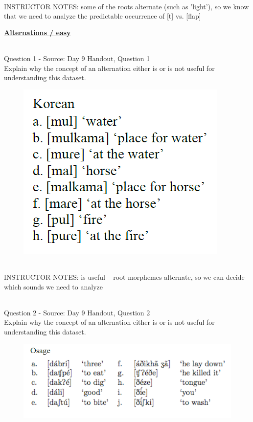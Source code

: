 \documentclass[12pt]{article}
\begin{document}
~\\
INSTRUCTOR NOTES: some of the roots alternate (such as 'light'), so we know that we need to analyze the predictable occurrence of [t] vs. [flap]


\newpage\textbf{\underline{\huge Alternations / easy\\}}

~\\

{\large Question 1} - Source: Day 9 Handout, Question 1\\

Explain why the concept of an alternation either is or is not useful for understanding this dataset.\\

\begin{figure}[H]
\includegraphics{../images/korean.png}
\end{figure}

~\\
INSTRUCTOR NOTES: is useful -- root morphemes alternate, so we can decide which sounds we need to analyze


~\\

{\large Question 2} - Source: Day 9 Handout, Question 2\\

Explain why the concept of an alternation either is or is not useful for understanding this dataset.\\

\begin{figure}[H]
\includegraphics{../images/osage.png}
\end{figure}
\end{document}
